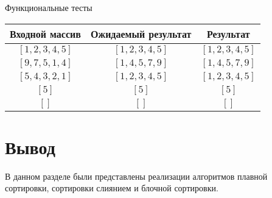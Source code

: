 	\begin{center}
		\begin{threeparttable}
			
				\caption{\label{tbl:functional_test} Функциональные тесты}
			\begin{tabular}{|c|c|c|}
				\hline
				Входной массив & Ожидаемый результат & Результат \\ 
				\hline
				$[1, 2, 3, 4, 5]$ & $[1, 2, 3, 4, 5]$  & $[1, 2, 3, 4, 5]$\\
				$[9, 7, 5, 1, 4]$  & $[1, 4, 5, 7, 9]$  & $[1, 4, 5, 7, 9]$\\
				$[5, 4, 3, 2, 1]$  & $[1, 2, 3, 4, 5]$ & $[1, 2, 3, 4, 5]$\\
				$[5]$  & $[5]$  & $[5]$\\
				$[]$  & $[]$  & $[]$\\
				\hline
			\end{tabular}
	
		\end{threeparttable}
	\end{center}



\section*{Вывод}
В данном разделе были представлены реализации алгоритмов плавной сортировки, сортировки слиянием и блочной сортировки.